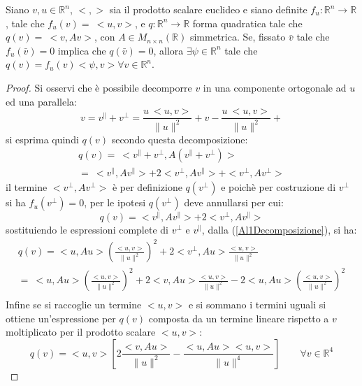 \begin{lemma}
    Siano $v,u\in \mathbb{R}^n$, $<,>$ sia il prodotto scalare euclideo e siano definite $f_u: \mathbb{R}^n\rightarrow\mathbb{R}$, 
    tale che $f_u(v)=\ <u,v>$, e $q:\mathbb{R}^n\rightarrow\mathbb{R}$ forma quadratica tale che $q
    (v)=\ <v,Av>$, con $A\in M_{n\times n}(\mathbb{R})$ simmetrica. Se, fissato $\bar{v}$ tale che $f_u(\bar{v})=0$ implica che $q(\bar{v})=0$,
    allora $\exists \psi\in \mathbb{R}^n$ tale che $q(v)=f_u(v)<\psi,v> \forall v\in \mathbb{R}^n$.
    \label{lemm:A1}
\end{lemma}
\begin{proof}
    Si osservi che è possibile decomporre $v$ in una componente
    ortogonale ad $u$ ed una parallela:
    \begin{equation}
        v=v^\parallel +v^\bot =\frac{u\ <u,v>}{\|u\|^2}+v-\frac{u\ <u,v>}{\|u\|^2}+
    \label{Al1Decomposizione}
    \end{equation}  
    si esprima quindi $q(v)$ secondo questa decomposizione:
    \begin{equation*}
        \begin{gathered}
            q(v)=\ <v^\parallel +v^\bot,A(v^\parallel +v^\bot)>\\
            =\ <v^\parallel ,Av^\parallel >+2<v^\bot,Av^\parallel>+<v^\bot,Av^\bot>
        \end{gathered}
    \end{equation*}
    il termine $<v^\bot,Av^\bot>$ è per definizione $q(v^\bot)$ e poichè 
    per costruzione di $v^\bot$ si ha $f_u(v^\bot)=0$, per le ipotesi $q(v^\bot)$
    deve annullarsi per cui:
   \begin{equation*}
    q(v)=<v^\parallel ,Av^\parallel >+2<v^\bot,Av^\parallel>
   \end{equation*}
   sostituiendo le espressioni complete di $v^\bot$ e $v^\parallel$, dalla (\ref{Al1Decomposizione}), si ha:
   \begin{equation*}
    \begin{gathered}
        q(v)=<u ,Au >\left(\frac{<u,v>}{\|u\|^2} \right)^2 +2 <v^\bot,Au> \frac{<u,v>}{\|u\|^2}\\
        =\ <u ,Au >\left(\frac{<u,v>}{\|u\|^2} \right)^2 +2 <v,Au> \frac{<u,v>}{\|u\|^2} -2<u ,Au >\left(\frac{<u,v>}{\|u\|^2} \right)^2\\
    \end{gathered}
   \end{equation*}
   Infine se si raccoglie un termine $<u,v>$ e si sommano i termini uguali si ottiene un'espressione per $q(v)$ composta da un termine lineare 
   rispetto a $v$ moltiplicato per il prodotto scalare $<u,v>$:
   \begin{equation}
    q(v)=<u,v>\left[2 \frac{<v,Au>}{\|u\|^2}-\frac{<u ,Au ><u,v>}{\|u\|^4} \right] \qquad \forall v\in\mathbb{R}^4
   \end{equation}
\end{proof}

